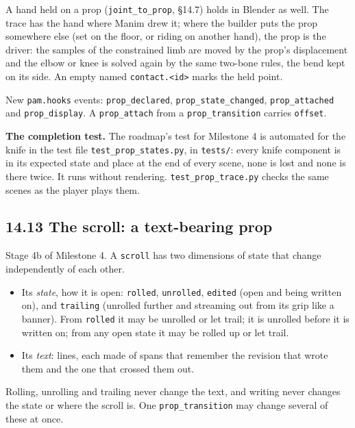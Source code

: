 \documentclass[
  12pt,
  letterpaper,
]{book}
\providecommand{\tightlist}{%
  \setlength{\itemsep}{0pt}\setlength{\parskip}{0pt}}
\begin{document}
A hand held on a prop (\texttt{joint\_to\_prop}, \S14.7) holds in
Blender as well. The trace has the hand where Manim drew it; where the
builder puts the prop somewhere else (set on the floor, or riding on
another hand), the prop is the driver: the samples of the constrained
limb are moved by the prop's displacement and the elbow or knee is
solved again by the same two-bone rules, the bend kept on its side. An
empty named \texttt{contact.<id>} marks the held point.

New \texttt{pam.hooks} events: \texttt{prop\_declared},
\texttt{prop\_state\_changed}, \texttt{prop\_attached} and
\texttt{prop\_display}. A \texttt{prop\_attach} from a
\texttt{prop\_transition} carries \texttt{offset}.

\textbf{The completion test.} The roadmap's test for Milestone 4 is
automated for the knife in the test file \texttt{test\_prop\_states.py},
in \texttt{tests/}: every knife component is in its expected state and
place at the end of every scene, none is lost and none is there twice.
It runs without rendering. \texttt{test\_prop\_trace.py} checks the
same scenes as the player plays them.

\subsection{14.13 The scroll: a text-bearing prop}\label{scroll}

Stage 4b of Milestone 4. A \texttt{scroll} has two dimensions of state
that change independently of each other.

\begin{itemize}
\tightlist
\item
  Its \emph{state}, how it is open: \texttt{rolled},
  \texttt{unrolled}, \texttt{edited} (open and being written on), and
  \texttt{trailing} (unrolled further and streaming out from its grip
  like a banner). From \texttt{rolled} it may be unrolled or let trail;
  it is unrolled before it is written on; from any open state it may
  be rolled up or let trail.
\item
  Its \emph{text}: lines, each made of spans that remember the
  revision that wrote them and the one that crossed them out.
\end{itemize}

Rolling, unrolling and trailing never change the text, and writing
never changes the state or where the scroll is. One
\texttt{prop\_transition} may change several of these at once.
\end{document}
